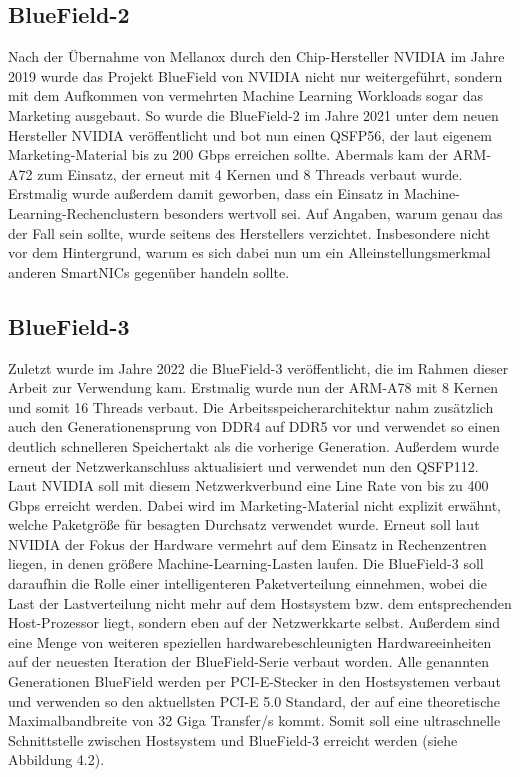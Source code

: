 \subsection{BlueField-2}
Nach der Übernahme von Mellanox durch den Chip-Hersteller NVIDIA im Jahre 2019 wurde das Projekt BlueField von NVIDIA nicht nur weitergeführt, sondern mit dem Aufkommen von vermehrten Machine Learning Workloads sogar das Marketing ausgebaut. So wurde die BlueField-2 im Jahre 2021 unter dem neuen Hersteller NVIDIA veröffentlicht und bot nun einen QSFP56, der laut eigenem Marketing-Material bis zu 200 Gbps erreichen sollte. Abermals kam der ARM-A72 zum Einsatz, der erneut mit 4 Kernen und 8 Threads verbaut wurde. \cite{bluefieldhistory} Erstmalig wurde außerdem damit geworben, dass ein Einsatz in Machine-Learning-Rechenclustern besonders wertvoll sei. Auf Angaben, warum genau das der Fall sein sollte, wurde seitens des Herstellers verzichtet. Insbesondere nicht vor dem Hintergrund, warum es sich dabei nun um ein Alleinstellungsmerkmal anderen SmartNICs gegenüber handeln sollte.
\subsection{BlueField-3}
Zuletzt wurde im Jahre 2022 die BlueField-3 veröffentlicht, die im Rahmen dieser Arbeit zur Verwendung kam. Erstmalig wurde nun der ARM-A78 mit 8 Kernen und somit 16 Threads verbaut. Die Arbeitsspeicherarchitektur nahm zusätzlich auch den Generationensprung von DDR4 auf DDR5 vor und verwendet so einen deutlich schnelleren Speichertakt als die vorherige Generation. Außerdem wurde erneut der Netzwerkanschluss aktualisiert und verwendet nun den QSFP112. Laut NVIDIA soll mit diesem Netzwerkverbund eine Line Rate von bis zu 400 Gbps erreicht werden. \cite{battle} Dabei wird im Marketing-Material nicht explizit erwähnt, welche Paketgröße für besagten Durchsatz verwendet wurde. Erneut soll laut NVIDIA der Fokus der Hardware vermehrt auf dem Einsatz in Rechenzentren liegen, in denen größere Machine-Learning-Lasten laufen. Die BlueField-3 soll daraufhin die Rolle einer intelligenteren Paketverteilung einnehmen, wobei die Last der Lastverteilung nicht mehr auf dem Hostsystem bzw. dem entsprechenden Host-Prozessor liegt, sondern eben auf der Netzwerkkarte selbst. Außerdem sind eine Menge von weiteren speziellen hardwarebeschleunigten Hardwareeinheiten auf der neuesten Iteration der BlueField-Serie verbaut worden. Alle genannten Generationen BlueField werden per PCI-E-Stecker in den Hostsystemen verbaut und verwenden so den aktuellsten PCI-E 5.0 Standard, der auf eine theoretische Maximalbandbreite von 32 Giga Transfer/s kommt. Somit soll eine ultraschnelle Schnittstelle zwischen Hostsystem und BlueField-3 erreicht werden (siehe Abbildung 4.2).
